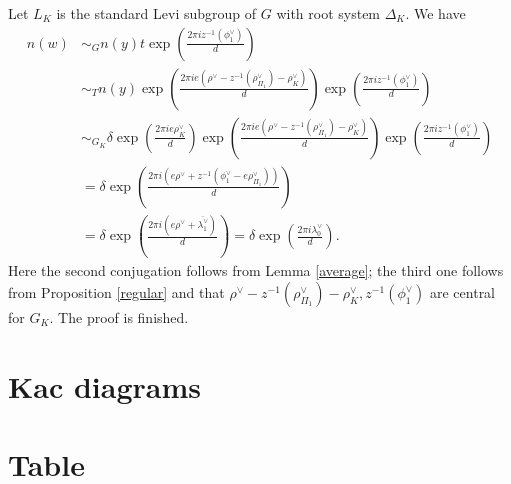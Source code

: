 \documentclass[12pt,leqno]{article}
\renewcommand{\sec}[1]{\section{#1}
\renewcommand{\theequation}{\thesection.\arabic{equation}}
  \setcounter{equation}{0}}
\def\d{\delta}
\def\D{\Delta}
\def\l{\lambda}
\renewcommand{\sec}[1]{\section{#1}
\renewcommand{\theequation}{\thesection.\arabic{equation}}
  \setcounter{equation}{0}}
\begin{document}
Let $L_K$ is the standard Levi subgroup of $G$ with root system $\D_K$. We have \begin{align*} n(w) &\sim_G  n(y) t \exp(\frac{2 \pi i z^{-1}(\phi_1^\vee)}{d}) \\ & \sim_T n(y) \exp(\frac{2\pi i e (\rho^\vee-z^{-1}(\rho_{\Pi_1}^\vee)-\rho_K^\vee)}{d}) \exp(\frac{2 \pi i z^{-1}(\phi_1^\vee)}{d}) \\ & \sim_{G_K} \d \exp(\frac{2 \pi i e \rho_K^\vee}{d}) \exp(\frac{2\pi i e (\rho^\vee-z^{-1}(\rho_{\Pi_1}^\vee)-\rho_K^\vee)}{d}) \exp(\frac{2 \pi i z^{-1}(\phi_1^\vee)}{d}) \\ &=\d \exp(\frac{2\pi i (e\rho^\vee + z^{-1}(\phi_1^\vee - e\rho_{\Pi_1}^\vee))}{d}) \\ &=\d \exp(\frac{2\pi i (e\rho^\vee + \overline{\l_1^\vee})}{d})=\d \exp(\frac{2 \pi i \l_0^\vee}{d}).
\end{align*} Here the second conjugation follows from Lemma \ref{average}; the third one follows from Proposition \ref{regular} and that $\rho^\vee-z^{-1}(\rho_{\Pi_1}^\vee)-\rho_K^\vee, z^{-1}(\phi_1^\vee)$ are central for $G_K$. The proof is finished.
\sec{Kac diagrams}

\sec{Table}

 

\end{document}
